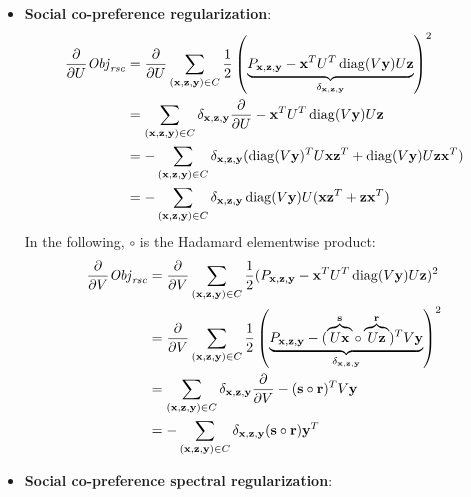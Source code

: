 \begin{itemize}
\item {\bf Social co-preference regularization}:
\begin{align*}
\frac{\partial}{\partial U} \Obj_\rsc & = \frac{\partial}{\partial U} \sum_{(\x,\z,\y) \in C} \frac{1}{2} \left( \underbrace{P_{\x,\z,\y} - \x^T U^T \diag(V\y) U \z}_{\delta_{\x,\z,\y}} \right)^2\\
& = \sum_{(\x,\z,\y) \in C} \delta_{\x,\z,\y} \frac{\partial}{\partial U} - \x^T U^T \diag(V\y) U \z \\
& = - \sum_{(\x,\z,\y) \in C} \delta_{\x,\z,\y} (\diag(V\y)^T U \x \z^T + \diag(V\y) U \z \x^T)\\ %
& = - \sum_{(\x,\z,\y) \in C} \delta_{\x,\z,\y} \diag(V\y) U (\x \z^T + \z \x^T)\\
\end{align*}
In the following, $\circ$ is the Hadamard elementwise product:
\begin{align*}
\frac{\partial}{\partial V} \mathit{Obj}_{\mathit{rsc}} & = \frac{\partial}{\partial V} \sum_{(\mathbf{x},\mathbf{z},\mathbf{y}) \in C} \frac{1}{2} (P_{\mathbf{x},\mathbf{z},\mathbf{y}} - \mathbf{x}^T U^T \operatorname{diag}(V\mathbf{y}) U \mathbf{z})^2\\
 & = \frac{\partial}{\partial V} \sum_{(\mathbf{x},\mathbf{z},\mathbf{y}) \in C} \frac{1}{2} \left( \underbrace{P_{\mathbf{x},\mathbf{z},\mathbf{y}} -  (\overbrace{U\mathbf{x}}^{\mathbf{s}} \circ \overbrace{U\mathbf{z}}^{\mathbf{r}})^T V\mathbf{y}}_{\delta_{\mathbf{x},\mathbf{z},\mathbf{y}}} \right)^2\\
 & = \sum_{(\mathbf{x},\mathbf{z},\mathbf{y}) \in C} \delta_{\mathbf{x},\mathbf{z},\mathbf{y}} \frac{\partial}{\partial V} - (\mathbf{s} \circ \mathbf{r})^T V\mathbf{y}\\
 & = - \sum_{(\mathbf{x},\mathbf{z},\mathbf{y}) \in C} \delta_{\mathbf{x},\mathbf{z},\mathbf{y}} (\mathbf{s} \circ \mathbf{r}) \mathbf{y}^T
\end{align*}
\item {\bf Social co-preference spectral regularization}:

\end{itemize}
